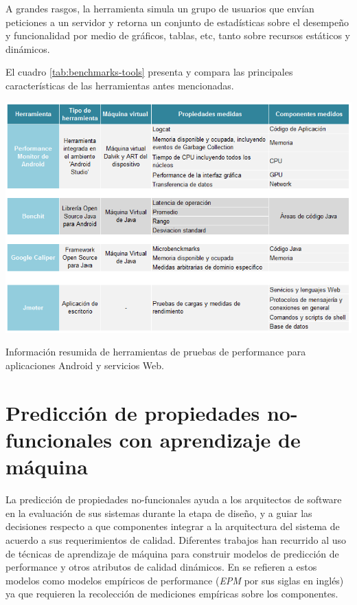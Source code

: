 A grandes rasgos, la herramienta simula un grupo de usuarios que envían
peticiones a un servidor y retorna un conjunto de estadísticas sobre
el desempeño y funcionalidad por medio de gráficos, tablas, etc, tanto
sobre recursos estáticos y dinámicos. 

El cuadro \ref{tab:benchmarks-tools} presenta y compara las principales
características de las herramientas antes mencionadas.

\begin{table}[h]
\begin{centering}
\includegraphics[scale=0.47]{images/benchmarks_tools}
\par\end{centering}

\caption{Información resumida de herramientas de pruebas de performance para
aplicaciones Android y servicios Web.}
\label{tab:benchmarks-tools}
\end{table}



\section{Predicción de propiedades no-funcionales con aprendizaje de máquina
\label{sec:Predicci=0000F3n-de-propiedades-no-funcionales-con-aprendizaje-de-m=0000E1quina}}

La predicción de propiedades no-funcionales ayuda a los arquitectos
de software en la evaluación de sus sistemas durante la etapa de diseño,
y a guiar las decisiones respecto a que componentes integrar a la
arquitectura del sistema de acuerdo a sus requerimientos de calidad.
Diferentes trabajos han recurrido al uso de técnicas de aprendizaje
de máquina para construir modelos de predicción de performance y otros
atributos de calidad dinámicos. En \citet{Hutter2014}se refieren
a estos modelos como modelos empíricos de performance (\emph{EPM}
por sus siglas en inglés) ya que requieren la recolección de mediciones
empíricas sobre los componentes. 

